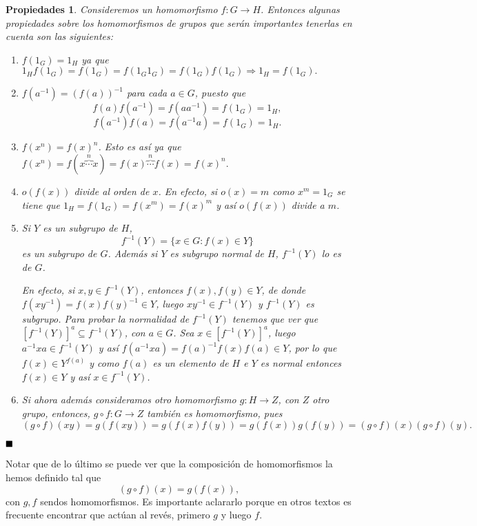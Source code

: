 \documentclass[12pt]{article}
\newtheorem{properties}{Propiedades}[theorem]
\begin{document}
\begin{properties}\label{eq:propHoms} Consideremos un homomorfismo $f \colon G \longrightarrow H$. Entonces algunas propiedades sobre los homomorfismos de grupos que serán importantes tenerlas en cuenta son las siguientes:
\begin{enumerate}
\item $f(1_{G}) = 1_{H}$ ya que $1_{H}f(1_{G}) = f(1_{G}) = f(1_{G}1_{G}) = f(1_{G})f(1_{G}) \Longrightarrow 1_{H} = f(1_{G}).$
\item $f(a^{-1}) = (f(a))^{-1}$ para cada $a \in G$, puesto que $$f(a)f(a^{-1}) = f(aa^{-1}) = f(1_{G}) = 1_{H},$$ $$f(a^{-1})f(a) = f(a^{-1}a) = f(1_{G}) = 1_{H}.$$
\item $f(x^n) = f(x)^n$. Esto es así ya que $f(x^n) = f(x\overbrace{\cdots}^n x) = f(x) \overbrace{\cdots}^n f(x) = f(x)^n.$
\item $o(f(x))$ divide al orden de $x$. En efecto, si $o(x) = m$ como $x^{m} = 1_{G}$ se tiene que $1_{H} = f(1_{G}) = f(x^{m}) = f(x)^{m}$ y así $o(f(x))$ divide a $m$. 
\item Si $Y$ es un subgrupo de $H$, $$f^{-1}(Y) = \lbrace x \in G : f(x) \in Y\rbrace$$ es un subgrupo de $G$. Además si $Y$ es subgrupo normal de $H$, $f^{-1}(Y)$ lo es de $G$.

En efecto, si $x,y \in f^{-1}(Y)$, entonces $f(x),f(y) \in Y$, de donde $f(xy^{-1}) = f(x)f(y)^{-1} \in Y$, luego $xy^{-1} \in f^{-1}(Y)$ y $f^{-1}(Y)$ es subgrupo. Para probar la normalidad de $f^{-1}(Y)$ tenemos que ver que $[f^{-1}(Y)]^a \subseteq f^{-1}(Y)$, con $a \in G$. Sea $x \in [f^{-1}(Y)]^a$, luego $a^{-1}xa \in f^{-1}(Y)$ y así $f(a^{-1}xa)=f(a)^{-1}f(x)f(a) \in Y$, por lo que $f(x) \in Y^{f(a)}$ y como $f(a)$ es un elemento de $H$ e $Y$ es normal entonces $f(x) \in Y$ y así $x \in f^{-1}(Y)$.
 
\item Si ahora además consideramos otro homomorfismo $g\colon H \longrightarrow  Z$, con $Z$ otro grupo, entonces,
$g \circ f\colon G \longrightarrow  Z$ también es homomorfismo, pues $$ (g \circ f)(xy) = g(f(xy)) = g(f(x)f(y)) = g(f(x))g(f(y)) = (g \circ f)(x) (g \circ f)(y).$$
\end{enumerate}
\end{properties}
$\hfill \blacksquare$

Notar que de lo último se puede ver que la composición de homomorfismos la hemos definido tal que $$(g \circ f)(x) = g(f(x)),$$ con $g,f$ sendos homomorfismos. Es importante aclararlo porque en otros textos es frecuente encontrar que actúan al revés, primero $g$ y luego $f$.
\end{document}
